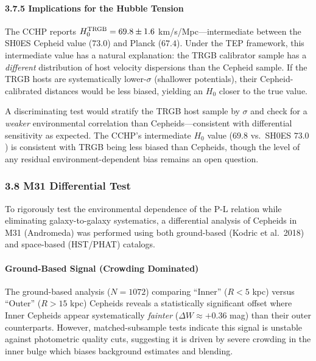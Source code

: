 \documentclass[
]{article}
\begin{document}
\paragraph{3.7.5 Implications for the Hubble
Tension}\label{implications-for-the-hubble-tension}

The CCHP reports \(H_0^{\rm TRGB} = 69.8 \pm 1.6\)
km/s/Mpc---intermediate between the SH0ES Cepheid value (\(73.0\)) and
Planck (\(67.4\)). Under the TEP framework, this intermediate value has
a natural explanation: the TRGB calibrator sample has a \emph{different}
distribution of host velocity dispersions than the Cepheid sample. If
the TRGB hosts are systematically lower-\(\sigma\) (shallower
potentials), their Cepheid-calibrated distances would be less biased,
yielding an \(H_0\) closer to the true value.

A discriminating test would stratify the TRGB host sample by \(\sigma\)
and check for a \emph{weaker} environmental correlation than
Cepheids---consistent with differential sensitivity as expected. The
CCHP's intermediate \(H_0\) value (\(69.8\) vs.~SH0ES \(73.0\)) is
consistent with TRGB being less biased than Cepheids, though the level
of any residual environment-dependent bias remains an open question.

\subsubsection{3.8 M31 Differential Test}\label{m31-differential-test}

To rigorously test the environmental dependence of the P-L relation
while eliminating galaxy-to-galaxy systematics, a differential analysis
of Cepheids in M31 (Andromeda) was performed using both ground-based
(Kodric et al.~2018) and space-based (HST/PHAT) catalogs.

\paragraph{Ground-Based Signal (Crowding
Dominated)}\label{ground-based-signal-crowding-dominated}

The ground-based analysis (\(N=1072\)) comparing ``Inner'' (\(R < 5\)
kpc) versus ``Outer'' (\(R > 15\) kpc) Cepheids reveals a statistically
significant offset where Inner Cepheids appear systematically
\emph{fainter} (\(\Delta W \approx +0.36\) mag) than their outer
counterparts. However, matched-subsample tests indicate this signal is
unstable against photometric quality cuts, suggesting it is driven by
severe crowding in the inner bulge which biases background estimates and
blending.
\end{document}
